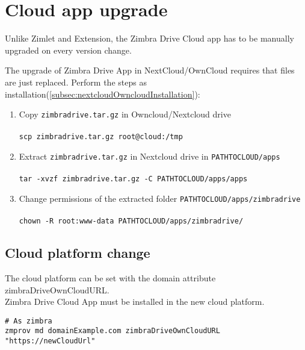 \section{Cloud app upgrade}
Unlike Zimlet and Extension, the Zimbra Drive Cloud app has to be manually upgraded on every version change.

The upgrade of Zimbra Drive App in NextCloud/OwnCloud requires that files are just replaced.
Perform the steps as installation(\ref{subsec:nextcloudOwncloudInstallation}):
    \begin{enumerate}
        \item Copy \texttt{zimbradrive.tar.gz} in Owncloud/Nextcloud drive\\ \\
        \texttt{scp zimbradrive.tar.gz root@cloud:/tmp}\\
        \item Extract \texttt{zimbradrive.tar.gz} in Nextcloud drive in \texttt{PATH\textunderscore TO\textunderscore CLOUD/apps}\\ \\
        \texttt{tar -xvzf zimbradrive.tar.gz -C \texttt{PATH\textunderscore TO\textunderscore CLOUD/apps}/apps}\\
        \item Change permissions of the extracted folder \texttt{PATH\textunderscore TO\textunderscore CLOUD/apps/zimbradrive}\\ \\
        \texttt{chown -R root:www-data \texttt{PATH\textunderscore TO\textunderscore CLOUD}/apps/zimbradrive/}\\
    \end{enumerate}

\subsection{Cloud platform change}
The cloud platform can be set with the domain attribute zimbraDriveOwnCloudURL.\\
Zimbra Drive Cloud App must be installed in the new cloud platform.
\begin{verbatim}
# As zimbra
zmprov md domainExample.com zimbraDriveOwnCloudURL "https://newCloudUrl"
\end{verbatim}
